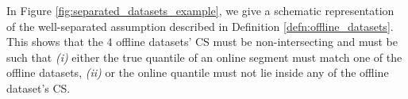 {\color{black}
In Figure \ref{fig:separated_datasets_example}, we give a schematic representation of the well-separated assumption described in Definition \ref{defn:offline_datasets}. This shows that the $4$ offline datasets' CS must be non-intersecting and must be such that {\em(i)} either the true quantile of an online segment must match one of the offline datasets, {\em(ii)} or the online quantile must not lie inside any of the offline dataset's CS. 


}

